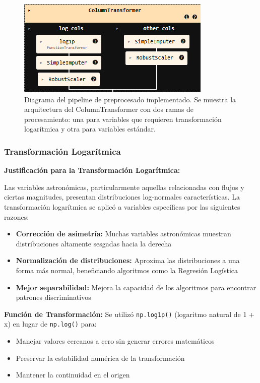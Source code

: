 \documentclass{article}
\begin{document}
\begin{figure}[H]
    \centering
    \includegraphics[width=0.6\linewidth]{preprocesado_pipeline.png}
    \caption{Diagrama del pipeline de preprocesado implementado. Se muestra la arquitectura del ColumnTransformer con dos ramas de procesamiento: una para variables que requieren transformación logarítmica y otra para variables estándar.}
    \label{fig:pipeline_preprocesado}
\end{figure}

\subsubsection{Transformación Logarítmica}

\textbf{Justificación para la Transformación Logarítmica:}

Las variables astronómicas, particularmente aquellas relacionadas con flujos y ciertas magnitudes, presentan distribuciones log-normales características. La transformación logarítmica se aplicó a variables específicas por las siguientes razones:

\begin{itemize}
    \item \textbf{Corrección de asimetría:} Muchas variables astronómicas muestran distribuciones altamente sesgadas hacia la derecha
    \item \textbf{Normalización de distribuciones:} Aproxima las distribuciones a una forma más normal, beneficiando algoritmos como la Regresión Logística
    \item \textbf{Mejor separabilidad:} Mejora la capacidad de los algoritmos para encontrar patrones discriminativos
\end{itemize}

\textbf{Función de Transformación:}
Se utilizó \texttt{np.log1p()} (logaritmo natural de 1 + x) en lugar de \texttt{np.log()} para:
\begin{itemize}
    \item Manejar valores cercanos a cero sin generar errores matemáticos
    \item Preservar la estabilidad numérica de la transformación
    \item Mantener la continuidad en el origen
\end{itemize}
\end{document}
